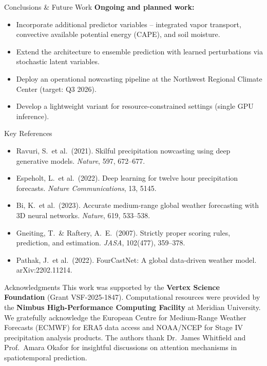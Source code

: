 \documentclass{article}
\newcommand{\sectionicon}[1]{\makebox[1.3em][l]{#1}}
\begin{document}
\begin{minipage}[t]{0.485\textwidth}
\begin{posterblock}{\sectionicon{\faFlagCheckered} Conclusions \& Future Work}
\vspace{4pt}
\textbf{Ongoing and planned work:}
\begin{itemize}[leftmargin=*,itemsep=1pt]
  \item Incorporate additional predictor variables -- integrated vapor transport, convective available potential energy (CAPE), and soil moisture.
  \item Extend the architecture to ensemble prediction with learned perturbations via stochastic latent variables.
  \item Deploy an operational nowcasting pipeline at the Northwest Regional Climate Center (target: Q3 2026).
  \item Develop a lightweight variant for resource-constrained settings (single GPU inference).
\end{itemize}
\end{posterblock}

\begin{posterblock}{\sectionicon{\faBook} Key References}
\footnotesize
\begin{itemize}[leftmargin=*,itemsep=1pt]
  \item[{[}1{]}] Ravuri, S.\ et al.\ (2021). Skilful precipitation nowcasting using deep generative models. \textit{Nature}, 597, 672--677.
  \item[{[}2{]}] Espeholt, L.\ et al.\ (2022). Deep learning for twelve hour precipitation forecasts. \textit{Nature Communications}, 13, 5145.
  \item[{[}3{]}] Bi, K.\ et al.\ (2023). Accurate medium-range global weather forecasting with 3D neural networks. \textit{Nature}, 619, 533--538.
  \item[{[}4{]}] Gneiting, T.\ \& Raftery, A.\ E.\ (2007). Strictly proper scoring rules, prediction, and estimation. \textit{JASA}, 102(477), 359--378.
  \item[{[}5{]}] Pathak, J.\ et al.\ (2022). FourCastNet: A global data-driven weather model. arXiv:2202.11214.
\end{itemize}
\end{posterblock}

\begin{posterblock}{\sectionicon{\faHandshake} Acknowledgments}
\footnotesize
This work was supported by the \textbf{Vertex Science Foundation} (Grant VSF-2025-1847). Computational resources were provided by the \textbf{Nimbus High-Performance Computing Facility} at Meridian University. We gratefully acknowledge the European Centre for Medium-Range Weather Forecasts (ECMWF) for ERA5 data access and NOAA/NCEP for Stage IV precipitation analysis products. The authors thank Dr.\ James Whitfield and Prof.\ Amara Okafor for insightful discussions on attention mechanisms in spatiotemporal prediction.
\end{posterblock}

\end{minipage}
\end{document}
